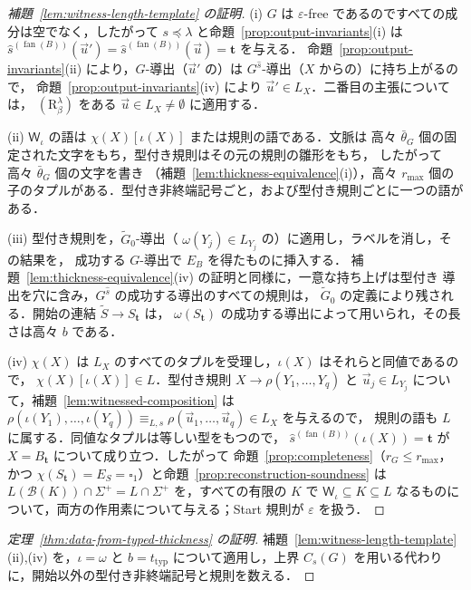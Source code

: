 \documentclass[11pt,a4paper]{ltjsarticle}
\numberwithin{equation}{section}
\theoremstyle{plain}
\theoremstyle{definition}
\theoremstyle{remark}
\newcommand{\Wit}{\mathsf{W}}
\newcommand{\tuple}[1]{\vec{#1}}
\newcommand{\blank}{\square}
\newcommand{\eps}{\varepsilon}
\newcommand{\fan}{\operatorname{fan}}
\theoremstyle{plain}
\begin{document}
\begin{proof}[補題~\ref{lem:witness-length-template} の証明]
(i) $G$ は $\eps$-free であるのですべての成分は空でなく，したがって $s\preceq\lambda$
と命題~\ref{prop:output-invariants}(i) は
$\widehat s^{(\fan(B))}(\tuple u')=\widehat s^{(\fan(B))}(\tuple u)=\mathbf t$ を与える．
命題~\ref{prop:output-invariants}(ii) により，$G$-導出（$\tuple u'$ の）は
$G^{\widehat s}$-導出（$X$ からの）に持ち上がるので，
命題~\ref{prop:output-invariants}(iv) により $\tuple u'\in L_X$．二番目の主張については，
$(\mathrm R_\beta^\lambda)$ をある $\tuple u\in L_X\ne\emptyset$ に適用する．

(ii) $\Wit_\iota$ の語は $\chi(X)[\iota(X)]$ または規則の語である．文脈は
高々 $\bar\theta_G$ 個の固定された文字をもち，型付き規則はその元の規則の雛形をもち，
したがって高々 $\bar\theta_G$ 個の文字を書き
（補題~\ref{lem:thickness-equivalence}(i)），高々 $r_{\max}$ 個の
子のタプルがある．型付き非終端記号ごと，および型付き規則ごとに一つの語がある．

(iii) 型付き規則を，$\widetilde G_0$-導出（
$\omega(Y_j)\in L_{Y_j}$ の）に適用し，ラベルを消し，その結果を，
成功する $G$-導出で $E_B$ を得たものに挿入する．
補題~\ref{lem:thickness-equivalence}(iv) の証明と同様に，一意な持ち上げは型付き
導出を穴に含み，$G^{\widehat s}$ の成功する導出のすべての規則は，
$\widetilde G_0$ の定義により残される．開始の連結 $\widetilde S\to S_{\mathbf t}$ は，
$\omega(S_{\mathbf t})$ の成功する導出によって用いられ，その長さは高々 $b$ である．

(iv) $\chi(X)$ は $L_X$ のすべてのタプルを受理し，$\iota(X)$ はそれらと同値であるので，
$\chi(X)[\iota(X)]\in L$．型付き規則 $X\to\rho(Y_1,\ldots,Y_q)$ と
$\tuple u_j\in L_{Y_j}$ について，補題~\ref{lem:witnessed-composition} は
$\rho(\iota(Y_1),\ldots,\iota(Y_q))\equiv_{L,s}\rho(\tuple u_1,\ldots,\tuple u_q)\in L_X$ を与えるので，
規則の語も $L$ に属する．同値なタプルは等しい型をもつので，
$\widehat s^{(\fan(B))}(\iota(X))=\mathbf t$ が $X=B_{\mathbf t}$ について成り立つ．したがって
命題~\ref{prop:completeness}（$r_G\le r_{\max}$，かつ
$\chi(S_{\mathbf t})=E_S=\blank_1$）と命題~\ref{prop:reconstruction-soundness}
は $L(\mathcal B(K))\cap\Sigma^+=L\cap\Sigma^+$ を，すべての有限の $K$ で
$\Wit_\iota\subseteq K\subseteq L$ なるものについて，両方の作用素について与える；Start 規則が $\eps$ を扱う．
\end{proof}

\begin{proof}[定理~\ref{thm:data-from-typed-thickness} の証明]
補題~\ref{lem:witness-length-template}(ii),(iv) を，$\iota=\omega$ と
$b=t_{\mathrm{typ}}$ について適用し，上界 $C_s(G)$ を用いる代わりに，開始以外の型付き非終端記号と規則を数える．
\end{proof}
\end{document}
